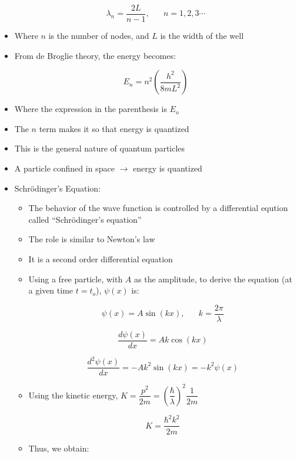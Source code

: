 \begin{itemize}
    $$\lambda_n=\frac{2L}{n-1},\,\,\,\,\,\,\,\,\,\,n=1,2,3\cdots$$

  \item Where $n$ is the number of nodes, and $L$ is the width of the well

  \item From de Broglie theory, the energy becomes:

    $$E_n=n^2\left( \frac{h^2}{8mL^2} \right)$$

  \item Where the expression in the parenthesis is $E_o$

  \item The $n$ term makes it so that energy is quantized

  \item This is the general nature of quantum particles

  \item A particle confined in space $\to$ energy is quantized

  \item Schr\"odinger's Equation:

    \begin{itemize}

      \item The behavior of the wave function is controlled by a differential eqution called ``Schr\"odinger's equation''

      \item The role is similar to Newton's  law

      \item It is a second order differential equation

      \item Using a free particle, with $A$ as the amplitude, to derive the equation (at a given time $t=t_o$), $\psi(x)$ is:

        $$\boxed{\psi(x)=A\sin(kx),\,\,\,\,\,\,\,\,\,\,k=\frac{2\pi}{\lambda}}$$

        $$\boxed{\frac{d\psi(x)}{dx}=Ak\cos(kx)}$$

        $$\boxed{\frac{d^2\psi(x)}{dx}=-Ak^2\sin(kx)=-k^2\psi(x)}$$

      \item Using the kinetic energy, $K=\dfrac{p^2}{2m}=\left( \dfrac{\hbar}{\lambda} \right)^2\dfrac{1}{2m}$

        $$K=\frac{\hbar^2k^2}{2m}$$

      \item Thus, we obtain:


\end{itemize}
\end{itemize}
